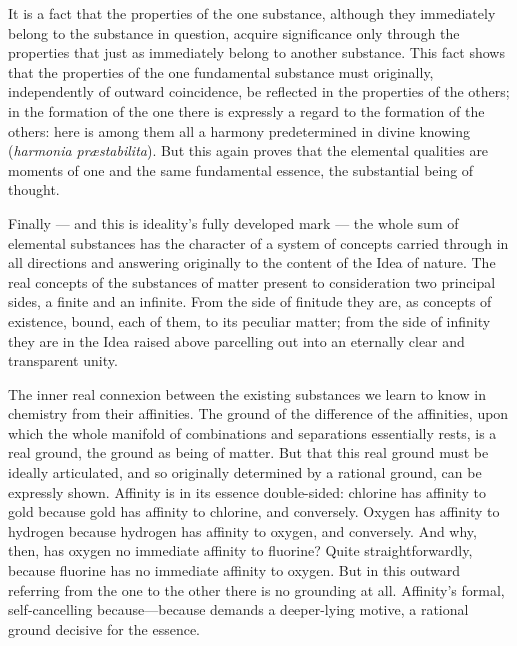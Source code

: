 \documentclass[12pt,a4paper]{book}
\begin{document}
It is a fact that the properties of the one substance, although they immediately belong to the substance in question,
acquire significance only through the properties that just as immediately belong to another substance. This fact
shows that the properties of the one fundamental substance must originally, independently of outward coincidence, be
reflected in the properties of the others; in the formation of the one there is expressly a regard to the formation
of the others: here is among them all a harmony predetermined in divine knowing
(\textit{harmonia præstabilita}). But this again proves that the elemental qualities are moments of one and the same
fundamental essence, the substantial being of thought.

Finally --- and this is ideality's fully developed mark --- the whole sum of elemental substances has the character of
a system of concepts carried through in all directions and answering originally to the content of the Idea of nature.
The real concepts of the substances of matter present to consideration two principal sides, a finite and an infinite.
From the side of finitude they are, as concepts of existence, bound, each of them, to its peculiar matter; from the
side of infinity they are in the Idea raised above parcelling out into an eternally clear and transparent unity.

The inner real connexion between the existing substances we learn to know in chemistry from their affinities. The
ground of the difference of the affinities, upon which the whole manifold of combinations and separations essentially
rests, is a real ground, the ground as being of matter. But that this real ground must be ideally articulated, and so
originally determined by a rational ground, can be expressly
shown. Affinity is in its essence double-sided: chlorine has affinity to gold because gold has affinity to chlorine,
and conversely. Oxygen has affinity to hydrogen because hydrogen has affinity to oxygen, and conversely. And why,
then, has oxygen no immediate affinity to fluorine? Quite straightforwardly, because fluorine has no immediate
affinity to oxygen. But in this outward referring from the one to the other there is no grounding at all. Affinity's
formal, self-cancelling because---because
demands a deeper-lying motive, a rational ground decisive for the essence.
\end{document}
